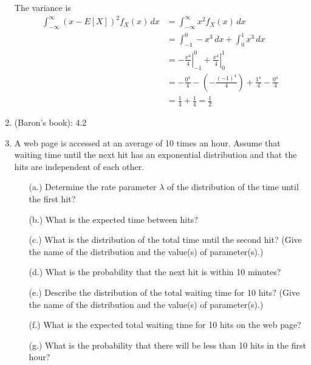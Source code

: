 \begin{enumerate}
{\begin{enumerate}
The variance is 
\begin{align*} 
\int_{-\infty}^\infty (x-E[X])^2 f_X(x) \, dx &= \int_{-\infty}^\infty x^2 f_X(x) \, dx \\
&= \int_{-1}^0 -x^3 \, dx + \int_0^1 x^3 \, dx  \\
&=  \left. -\frac{x^4}{4}\right|_{-1}^0 +  \left. \frac{x^4}{4}\right|_0^1 \\
&= -\frac{0^4}{4} - \left( -\frac{(-1)^4}{4} \right) + \frac{1^4}{4} - \frac{0^4}{4} \\
&= \frac{1}{4} + \frac{1}{4} = \frac{1}{2}
\end{align*}
\end{enumerate}
}

 \item (Baron's book): 4.2



\item A web page is accessed at an average of 10 times an hour. Assume that waiting time until the next hit has an exponential distribution and that the hits are independent of each other. 
\begin{itemize}
\item[(a.)] Determine the rate parameter $\lambda$ of the distribution of the time until the first hit?
\item[(b.)] What is the expected time between hits?
\item[(c.)] What is the distribution of the total time until the second hit? (Give the name of the distribution and the value(s) of parameter(s).) 
\item[(d.)] What is the probability that the next hit is within 10 minutes?
\item[(e.)] Describe the distribution of the total waiting time for 10 hits?  (Give the name of the distribution and the value(s) of parameter(s).)
 \item[(f.)] What is the expected total waiting time for 10 hits on the web page?
\item[(g.)] What is the probability that there will be less than 10 hits in the first hour?
\end{itemize}


\end{enumerate}
